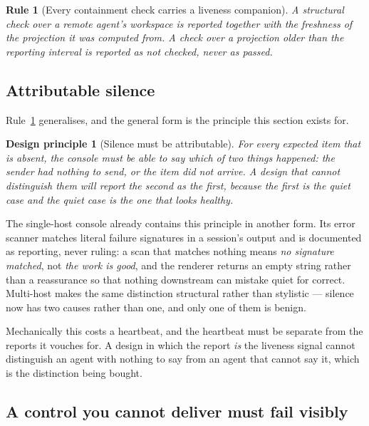 \documentclass[11pt]{article}
\newtheorem{principle}{Design principle}
\newtheorem{drule}{Rule}
\begin{document}
\begin{drule}[Every containment check carries a liveness companion]
\label{rule:liveness}
A structural check over a remote agent's workspace is reported together with the freshness of the projection it was computed from. A check over a projection older than the reporting interval is reported as \emph{not checked}, never as \emph{passed}.
\end{drule}

\subsection{Attributable silence}
\label{sec:attributable}

Rule~\ref{rule:liveness} generalises, and the general form is the principle this section exists for.

\begin{principle}[Silence must be attributable]
\label{prin:silence}
For every expected item that is absent, the console must be able to say which of two things happened: the sender had nothing to send, or the item did not arrive. A design that cannot distinguish them will report the second as the first, because the first is the quiet case and the quiet case is the one that looks healthy.
\end{principle}

The single-host console already contains this principle in another form. Its error scanner matches literal failure signatures in a session's output and is documented as reporting, never ruling: a scan that matches nothing means \emph{no signature matched}, not \emph{the work is good}, and the renderer returns an empty string rather than a reassurance so that nothing downstream can mistake quiet for correct. Multi-host makes the same distinction structural rather than stylistic --- silence now has two causes rather than one, and only one of them is benign.

Mechanically this costs a heartbeat, and the heartbeat must be separate from the reports it vouches for. A design in which the report \emph{is} the liveness signal cannot distinguish an agent with nothing to say from an agent that cannot say it, which is the distinction being bought.

\subsection{A control you cannot deliver must fail visibly}
\label{sec:undeliverable}
\end{document}
